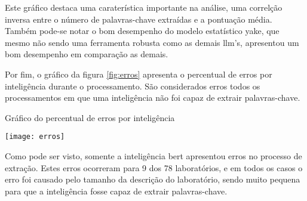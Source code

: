 Este gráfico destaca uma caraterística importante na análise, uma correlção inversa entre o número de palavras-chave extraídas e a pontuação média. Também pode-se notar o bom desempenho do modelo estatístico \gls{yake}, que mesmo não sendo uma ferramenta robusta como as demais \gls{llm}'s, apresentou um bom desempenho em comparação as demais.

Por fim, o gráfico da figura \ref{fig:erros} apresenta o percentual de erros por inteligência durante o processamento. São considerados erros todos os processamentos em que uma inteligência não foi capaz de extrair palavras-chave.

\begin{graph}[H]
  \caption{Gráfico do percentual de erros por inteligência}
  \texttt{[image: erros]}
  \label{fig:erros}
\end{graph}

Como pode ser visto, somente a inteligência \gls{bert} apresentou erros no processo de extração. Estes erros ocorreram para 9 dos 78 laboratórios, e em todos os casos o erro foi causado pelo tamanho da descrição do laboratório, sendo muito pequena para que a inteligência fosse capaz de extrair palavras-chave.